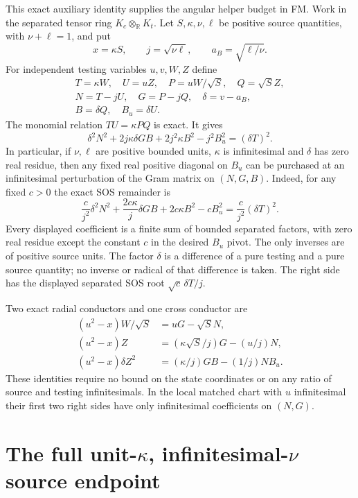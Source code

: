 This exact auxiliary identity supplies the angular helper budget in FM.
Work in the separated tensor ring $K_c\otimes_{\mathbb R}K_t$.
Let $S,\kappa,\nu,\ell$ be positive source quantities, with
$\nu+\ell=1$, and put
\[
 x=\kappa S,\qquad j=\sqrt{\nu\ell},\qquad
 a_B=\sqrt{\ell/\nu}.
 \tag{MB1}
\]
For independent testing variables $u,v,W,Z$ define
\[
\begin{gathered}
 T=\kappa W,\quad U=uZ,\quad P=uW/\sqrt S,\quad Q=\sqrt S Z,\\
 N=T-jU,\quad G=P-jQ,\quad \delta=v-a_B,\\
 B=\delta Q,\quad B_u=\delta U.
\end{gathered}
 \tag{MB2}
\]
The monomial relation $TU=\kappa PQ$ is exact. It gives
\[
 \delta^2N^2+2j\kappa\delta GB+2j^2\kappa B^2-j^2B_u^2
       =(\delta T)^2.
 \tag{MB3}
\]
In particular, if $\nu,\ell$ are positive bounded units,
$\kappa$ is infinitesimal and $\delta$ has zero real residue,
then any fixed real positive diagonal on $B_u$ can be purchased
at an infinitesimal perturbation of the Gram matrix on $(N,G,B)$.
Indeed, for any fixed $c>0$ the exact SOS remainder is
\[
 \frac{c}{j^2}\delta^2N^2+
       \frac{2c\kappa}{j}\delta GB+2c\kappa B^2-cB_u^2
       =\frac{c}{j^2}(\delta T)^2.
 \tag{MB4}
\]
Every displayed coefficient is a finite sum of bounded separated
factors, with zero real residue except the constant $c$ in the
desired $B_u$ pivot. The only inverses are of positive source units.
The factor $\delta$ is a difference of a pure testing and a pure
source quantity; no inverse or radical of that difference is taken.
The right side has the displayed separated SOS root
$\sqrt c\,\delta T/j$.

Two exact radial conductors and one cross conductor are
\[
 \begin{split}
 (u^2-x)W/\sqrt S&=uG-\sqrt S N,\\
 (u^2-x)Z&=(\kappa\sqrt S/j)G-(u/j)N,\\
 (u^2-x)\delta Z^2&=(\kappa/j)GB-(1/j)NB_u.
 \end{split}
 \tag{MB5}
\]
These identities require no bound on the state coordinates or on
any ratio of source and testing infinitesimals. In the local matched
chart with $u$ infinitesimal their first two right sides have only
infinitesimal coefficients on $(N,G)$.


\section{\texorpdfstring{The full unit-$\kappa$, infinitesimal-$\nu$ source endpoint}{The full unit-kappa, infinitesimal-nu source endpoint}}
\label{component:p578719565e9d}

